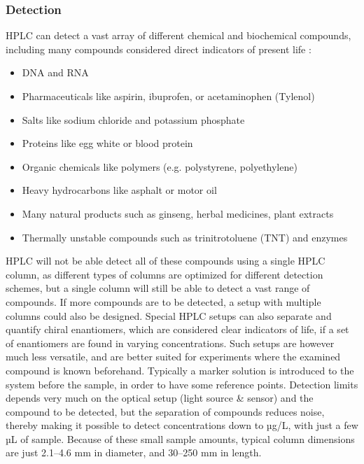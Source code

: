 \subsubsection{Detection}
HPLC can detect a vast array of different chemical and biochemical compounds, including many compounds considered direct indicators of present life \cite{hplcbasics}:
\begin{itemize}
    \item DNA and RNA
    \item Pharmaceuticals like aspirin, ibuprofen, or acetaminophen (Tylenol) 
    \item Salts like sodium chloride and potassium phosphate 
    \item Proteins like egg white or blood protein 
    \item Organic chemicals like polymers (e.g. polystyrene, polyethylene) 
    \item Heavy hydrocarbons like asphalt or motor oil 
    \item Many natural products such as ginseng, herbal medicines, plant extracts 
    \item Thermally unstable compounds such as trinitrotoluene (TNT) and enzymes 
\end{itemize}
HPLC will not be able detect all of these compounds using a single HPLC column, as different types of columns are optimized for different detection schemes, but a single column will still be able to detect a vast range of compounds. If more compounds are to be detected, a setup with multiple columns could also be designed. Special HPLC setups can also separate and quantify chiral enantiomers, which are considered clear indicators of life, if a set of enantiomers are found in varying concentrations. Such setups are however much less versatile, and are better suited for experiments where the examined compound is known beforehand.
Typically a marker solution is introduced to the system before the sample, in order to have some reference points. Detection limits depends very much on the optical setup (light source \& sensor) and the compound to be detected, but the separation of compounds reduces noise, thereby making it possible to detect concentrations down to µg/L, with just a few µL of sample. Because of these small sample amounts, typical column dimensions are just 2.1–4.6 mm in diameter, and 30–250 mm in length.

